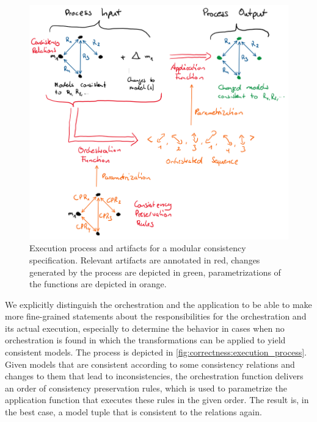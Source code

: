 \begin{figure}
    \centering
    \includegraphics[width=\textwidth]{figures/correctness/notion/execution_process.png}
    \caption[Consistency specification execution process and artifacts]{Execution process and artifacts for a modular consistency specification. Relevant artifacts are annotated in red, changes generated by the process are depicted in green, parametrizations of the functions are depicted in orange.}
    \label{fig:correctness:execution_process}
\end{figure}

We explicitly distinguish the orchestration and the application to be able to make more fine-grained statements about the responsibilities for the orchestration and its actual execution, especially to determine the behavior in cases when no orchestration is found in which the transformations can be applied to yield consistent models.
The process is depicted in \autoref{fig:correctness:execution_process}. Given models that are consistent according to some consistency relations and changes to them that lead to inconsistencies, the orchestration function delivers an order of consistency preservation rules, which is used to parametrize the application function that executes these rules in the given order.
The result is, in the best case, a model tuple that is consistent to the relations again.

